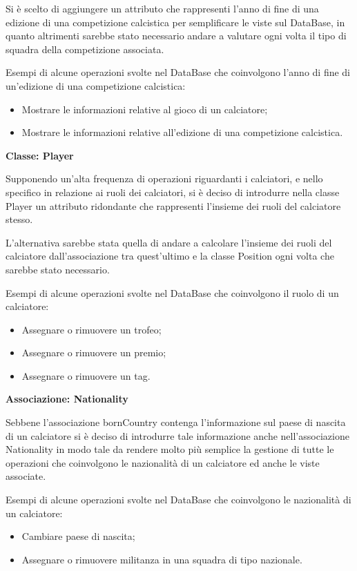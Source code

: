 Si è scelto di  aggiungere un attributo che rappresenti l'anno di fine di una edizione di una
competizione calcistica per semplificare le viste sul DataBase, in quanto altrimenti sarebbe
stato necessario andare a valutare ogni volta il tipo di squadra della competizione associata.

Esempi di alcune operazioni svolte nel DataBase che coinvolgono l'anno di fine di un'edizione
di una competizione calcistica:
\begin{itemize}
	\item Mostrare le informazioni relative al gioco di un calciatore;
	\item Mostrare le informazioni relative all'edizione di una competizione calcistica.
\end{itemize}

\textbf{Classe: Player}

Supponendo un'alta frequenza di operazioni riguardanti i calciatori, e nello specifico in relazione
ai ruoli dei calciatori, si è deciso di introdurre nella classe Player un attributo ridondante
che rappresenti l'insieme dei ruoli del calciatore stesso.

L'alternativa sarebbe stata quella di andare a calcolare l'insieme dei ruoli del calciatore
dall'associazione tra quest'ultimo e la classe Position ogni volta che sarebbe stato necessario.

Esempi di alcune operazioni svolte nel DataBase che coinvolgono il ruolo di un calciatore:
\begin{itemize}
	\item Assegnare o rimuovere un trofeo;
	\item Assegnare o rimuovere un premio;
	\item Assegnare o rimuovere un tag.
\end{itemize}


\textbf{Associazione: Nationality}

Sebbene l'associazione bornCountry contenga l'informazione sul paese di nascita di un calciatore
si è deciso di introdurre tale informazione anche nell'associazione Nationality in modo tale da
rendere molto più semplice la gestione di tutte le operazioni che coinvolgono le nazionalità
di un calciatore ed anche le viste associate.

Esempi di alcune operazioni svolte nel DataBase che coinvolgono le nazionalità di un calciatore:
\begin{itemize}
	\item Cambiare paese di nascita;
	\item Assegnare o rimuovere militanza in una squadra di tipo nazionale.
\end{itemize}

